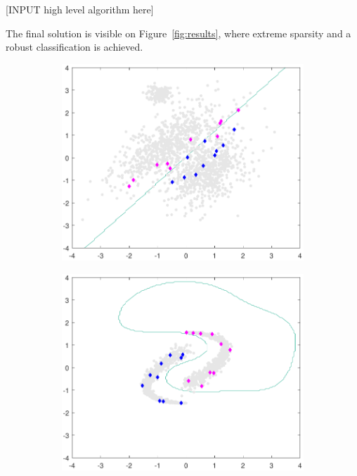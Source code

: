 \documentclass[preprint,12pt]{elsarticle}
\begin{document}
[INPUT high level algorithm here]



The final solution is visible on Figure~\ref{fig:results}, where extreme sparsity and a robust classification is achieved.


	\begin{figure}[!htb]
		\centering
		\begin{subfigure}[b]{0.40\linewidth}
			\centering\includegraphics[width=1\linewidth]{figures/normdatamodel_hyperplane_robsvm.pdf}
			\caption{\label{fig:solRob1}} 
		\end{subfigure}
		\begin{subfigure}[b]{0.40\linewidth}
			\centering\includegraphics[width=1\linewidth]{figures/yydatamodel_hyperplane_robsvm.pdf}
			\caption{\label{fig:solRob2}}
		\end{subfigure} \\
		

\end{figure}
\end{document}
